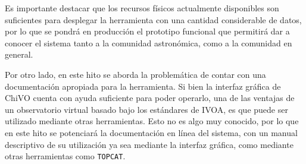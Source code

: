 Es importante destacar que los recursos físicos actualmente disponibles son
suficientes para desplegar la herramienta con una cantidad considerable de
datos, por lo que se pondrá en producción el prototipo funcional que permitirá
dar a conocer el sistema tanto a la comunidad astronómica, como a la comunidad
en general. 

Por otro lado, en este hito se aborda la problemática de contar con una
documentación apropiada para la herramienta. Si bien la interfaz gráfica de
ChiVO cuenta con ayuda suficiente para poder operarlo, una de las ventajas de un
observatorio virtual basado bajo los estándares de IVOA, es que puede ser
utilizado mediante otras herramientas. Esto no es algo muy conocido, por lo que
en este hito se potenciará la documentación en línea del sistema, con un manual
descriptivo de su utilización ya sea mediante la interfaz gráfica, como mediante
otras herramientas como \texttt{TOPCAT}\footnotemark.


